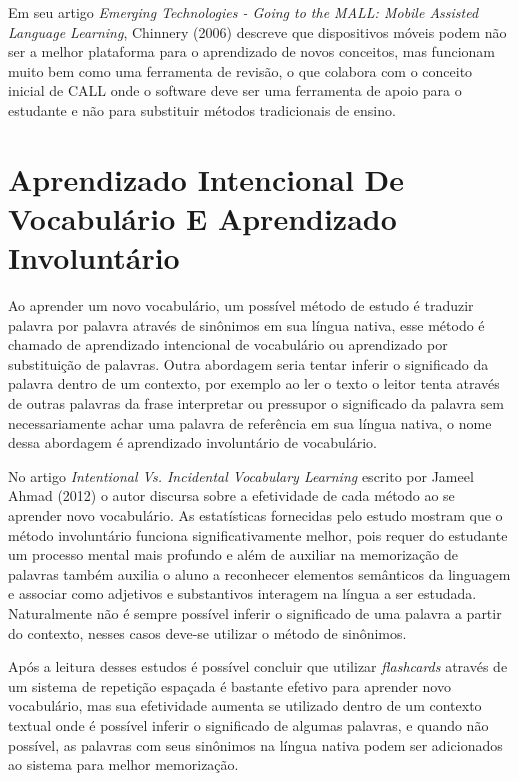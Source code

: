 Em seu artigo \textit{Emerging Technologies - Going to the MALL: Mobile Assisted Language Learning}, Chinnery (2006) descreve que dispositivos móveis podem não ser a melhor plataforma para o aprendizado de novos conceitos, mas funcionam muito bem como uma ferramenta de revisão, o que colabora com o conceito inicial de CALL onde o software deve ser uma ferramenta de apoio para o estudante e não para substituir métodos tradicionais de ensino.

\section{Aprendizado Intencional De Vocabulário E Aprendizado Involuntário}
Ao aprender um novo vocabulário, um possível método de estudo é traduzir palavra por palavra através de sinônimos em sua língua nativa, esse método é chamado de aprendizado intencional de vocabulário ou aprendizado por substituição de palavras. Outra abordagem seria tentar inferir o significado da palavra dentro de um contexto, por exemplo ao ler o texto o leitor tenta através de outras palavras da frase interpretar ou pressupor o significado da palavra sem necessariamente achar uma palavra de referência em sua língua nativa, o nome dessa abordagem é aprendizado involuntário de vocabulário.

No artigo \textit{Intentional Vs. Incidental Vocabulary Learning} escrito por Jameel Ahmad (2012) o autor discursa sobre a efetividade de cada método ao se aprender novo vocabulário. As estatísticas fornecidas pelo estudo mostram que o método involuntário funciona significativamente melhor, pois requer do estudante um processo mental mais profundo e além de auxiliar na memorização de palavras também auxilia o aluno a reconhecer elementos semânticos da linguagem e associar como adjetivos e substantivos interagem na língua a ser estudada. Naturalmente não é sempre possível inferir o significado de uma palavra a partir do contexto, nesses casos deve-se utilizar o método de sinônimos.

Após a leitura desses estudos é possível concluir que utilizar \textit{flashcards} através de um sistema de repetição espaçada é bastante efetivo para aprender novo vocabulário, mas sua efetividade aumenta se utilizado dentro de um contexto textual onde é possível inferir o significado de algumas palavras, e quando não possível, as palavras com seus sinônimos na língua nativa podem ser adicionados ao sistema para melhor memorização.


